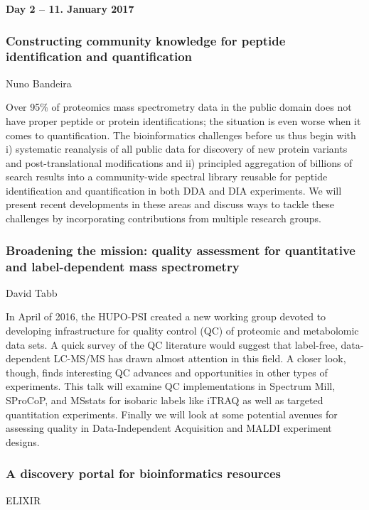 
\noindent\textbf{Day 2 -- 11. January 2017}

\subsubsection*{\color{eubicRed} Constructing community knowledge for peptide identification and quantification}
{\color{eubicGray}Nuno Bandeira}

Over 95\% of proteomics mass spectrometry data in the public domain does not
have proper peptide or protein identifications; the situation is even worse when
it comes to quantification. The bioinformatics challenges before us thus begin
with i) systematic reanalysis of all public data for discovery of new protein
variants and post-translational modifications and ii) principled aggregation of
billions of search results into a community-wide spectral library reusable for
peptide identification and quantification in both DDA and DIA experiments. We
will present recent developments in these areas and discuss ways to tackle these
challenges by incorporating contributions from multiple research groups.


\subsubsection*{\color{eubicRed} Broadening the mission: quality assessment for quantitative and label-dependent mass spectrometry}
{\color{eubicGray}David Tabb}

In April of 2016, the HUPO-PSI created a new working group devoted to developing
infrastructure for quality control (QC) of proteomic and metabolomic data sets.
A quick survey of the QC literature would suggest that label-free,
data-dependent LC-MS/MS has drawn almost attention in this field. A closer look,
though, finds interesting QC advances and opportunities in other types of
experiments. This talk will examine QC implementations in Spectrum Mill,
SProCoP, and MSstats for isobaric labels like iTRAQ as well as targeted
quantitation experiments. Finally we will look at some potential avenues for
assessing quality in Data-Independent Acquisition and MALDI experiment designs.


\subsubsection*{\color{eubicRed} A discovery portal for bioinformatics resources}
{\color{eubicGray}ELIXIR}

